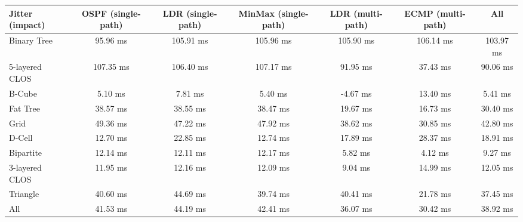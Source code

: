 \begin{tabular}{l|cccccc}
Jitter (impact) & OSPF (single-path) & LDR (single-path) & MinMax (single-path) & LDR (multi-path) & ECMP (multi-path) & All       \\
\hline
Binary Tree     & 95.96 ms           & 105.91 ms         & 105.96 ms            & 105.90 ms        & 106.14 ms         & 103.97 ms \\
5-layered CLOS  & 107.35 ms          & 106.40 ms         & 107.17 ms            & 91.95 ms         & 37.43 ms          & 90.06 ms  \\
B-Cube          & 5.10 ms            & 7.81 ms           & 5.40 ms              & -4.67 ms         & 13.40 ms          & 5.41 ms   \\
Fat Tree        & 38.57 ms           & 38.55 ms          & 38.47 ms             & 19.67 ms         & 16.73 ms          & 30.40 ms  \\
Grid            & 49.36 ms           & 47.22 ms          & 47.92 ms             & 38.62 ms         & 30.85 ms          & 42.80 ms  \\
D-Cell          & 12.70 ms           & 22.85 ms          & 12.74 ms             & 17.89 ms         & 28.37 ms          & 18.91 ms  \\
Bipartite       & 12.14 ms           & 12.11 ms          & 12.17 ms             & 5.82 ms          & 4.12 ms           & 9.27 ms   \\
3-layered CLOS  & 11.95 ms           & 12.16 ms          & 12.09 ms             & 9.04 ms          & 14.99 ms          & 12.05 ms  \\
Triangle        & 40.60 ms           & 44.69 ms          & 39.74 ms             & 40.41 ms         & 21.78 ms          & 37.45 ms  \\
All             & 41.53 ms           & 44.19 ms          & 42.41 ms             & 36.07 ms         & 30.42 ms          & 38.92 ms  \\
\end{tabular}